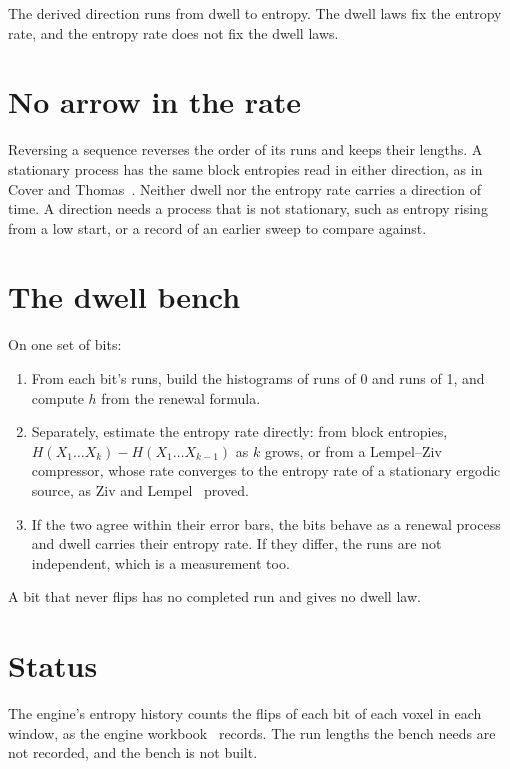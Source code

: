 The derived direction runs from dwell to entropy. The dwell laws fix the entropy rate, and the entropy rate does not fix the dwell laws.

\section{\texorpdfstring{No arrow in the rate}{No arrow in the rate}}

Reversing a sequence reverses the order of its runs and keeps their lengths. A stationary process has the same block entropies read in either direction, as in Cover and Thomas~\cite{src:Cover-Thomas-2006}. Neither dwell nor the entropy rate carries a direction of time. A direction needs a process that is not stationary, such as entropy rising from a low start, or a record of an earlier sweep to compare against.

\section{\texorpdfstring{The dwell bench}{The dwell bench}}

On one set of bits:

\begin{enumerate}
\item From each bit's runs, build the histograms of runs of 0 and runs of 1, and compute \(h\) from the renewal formula.
\item Separately, estimate the entropy rate directly: from block entropies, \(H(X_1 \ldots X_k) - H(X_1 \ldots X_{k-1})\) as \(k\) grows, or from a Lempel–Ziv compressor, whose rate converges to the entropy rate of a stationary ergodic source, as Ziv and Lempel~\cite{src:Ziv-Lempel-1978} proved.
\item If the two agree within their error bars, the bits behave as a renewal process and dwell carries their entropy rate. If they differ, the runs are not independent, which is a measurement too.
\end{enumerate}

A bit that never flips has no completed run and gives no dwell law.

\section{\texorpdfstring{Status}{Status}}

The engine's entropy history counts the flips of each bit of each voxel in each window, as the engine workbook~\cite{src:Quigg-engine-workbook} records. The run lengths the bench needs are not recorded, and the bench is not built.
